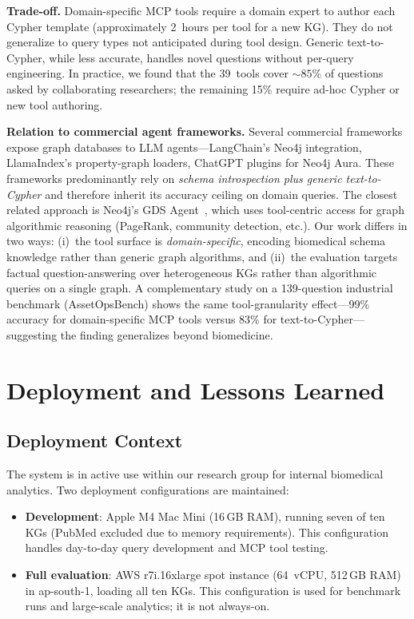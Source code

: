 \documentclass[runningheads]{llncs}
\begin{document}
\smallskip\noindent\textbf{Trade-off.}
Domain-specific MCP tools require a domain expert to author each
Cypher template (approximately 2~hours per tool for a new KG).
They do not generalize to query types not anticipated during tool
design.  Generic text-to-Cypher, while less accurate, handles
novel questions without per-query engineering.  In practice, we
found that the 39~tools cover ${\sim}85\%$ of questions asked by
collaborating researchers; the remaining 15\% require ad-hoc Cypher
or new tool authoring.

\smallskip\noindent\textbf{Relation to commercial agent frameworks.}
Several commercial frameworks expose graph databases to LLM
agents---LangChain's Neo4j integration, LlamaIndex's property-graph
loaders, ChatGPT plugins for Neo4j Aura.  These frameworks
predominantly rely on \emph{schema introspection plus generic
text-to-Cypher} and therefore inherit its accuracy ceiling on
domain queries.  The closest related approach is Neo4j's GDS
Agent~\cite{neo4j2025gdsagent}, which uses tool-centric access for
graph algorithmic reasoning (PageRank, community detection, etc.).
Our work differs in two ways: (i)~the tool surface is
\emph{domain-specific}, encoding biomedical schema knowledge rather
than generic graph algorithms, and (ii)~the evaluation targets
factual question-answering over heterogeneous KGs rather than
algorithmic queries on a single graph.  A complementary study on a
139-question industrial benchmark (AssetOpsBench) shows the same
tool-granularity effect---99\% accuracy for domain-specific MCP
tools versus 83\% for text-to-Cypher---suggesting the finding
generalizes beyond biomedicine.

\section{Deployment and Lessons Learned}\label{sec:deployment}

\subsection{Deployment Context}

The system is in active use within our research group for internal
biomedical analytics.  Two deployment configurations are maintained:

\begin{itemize}
\item \textbf{Development}: Apple M4 Mac Mini (16\,GB RAM),
  running seven of ten KGs (PubMed excluded due to memory
  requirements).  This configuration handles day-to-day query
  development and MCP tool testing.
\item \textbf{Full evaluation}: AWS r7i.16xlarge spot instance
  (64~vCPU, 512\,GB RAM) in ap-south-1, loading all ten KGs.
  This configuration is used for benchmark runs and
  large-scale analytics; it is not always-on.
\end{itemize}
\end{document}
